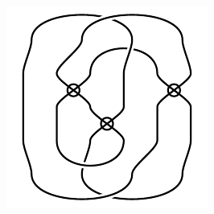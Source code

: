 \begin{figure}[H]
\begin{minipage}[b]{.18\linewidth}
\end{minipage}
\begin{minipage}[b]{.18\linewidth}
\centering
\includegraphics[width=\linewidth]{../data/virtual_4_41.png}
\end{minipage}
\end{figure}

